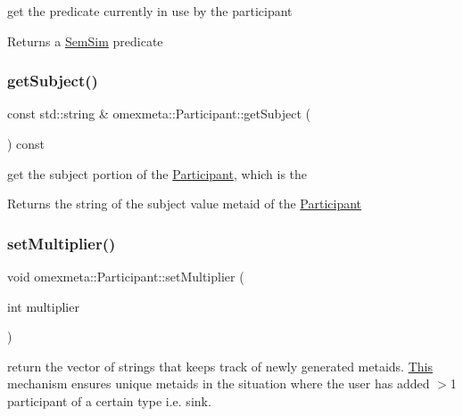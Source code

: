 get the predicate currently in use by the participant 

\begin{DoxyReturn}{Returns}
a \hyperlink{classomexmeta_1_1SemSim}{Sem\+Sim} predicate 
\end{DoxyReturn}
\mbox{\label{classomexmeta_1_1Participant_a232d2e7fe124ee13650d666fdfc3b866}} 
\subsubsection{\texorpdfstring{get\+Subject()}{getSubject()}}
{\footnotesize\ttfamily const std\+::string \& omexmeta\+::\+Participant\+::get\+Subject (\begin{DoxyParamCaption}{ }\end{DoxyParamCaption}) const}



get the subject portion of the \hyperlink{classomexmeta_1_1Participant}{Participant}, which is the 

\begin{DoxyReturn}{Returns}
the string of the subject value metaid of the \hyperlink{classomexmeta_1_1Participant}{Participant} 
\end{DoxyReturn}
\mbox{\label{classomexmeta_1_1Participant_a97c047d67dc86db1e617c3528bf8035e}} 
\subsubsection{\texorpdfstring{set\+Multiplier()}{setMultiplier()}}
{\footnotesize\ttfamily void omexmeta\+::\+Participant\+::set\+Multiplier (\begin{DoxyParamCaption}\item[{int}]{multiplier }\end{DoxyParamCaption})}



return the vector of strings that keeps track of newly generated metaids. \hyperlink{classThis}{This} mechanism ensures unique metaids in the situation where the user has added $>$1 participant of a certain type i.\+e. sink. 

